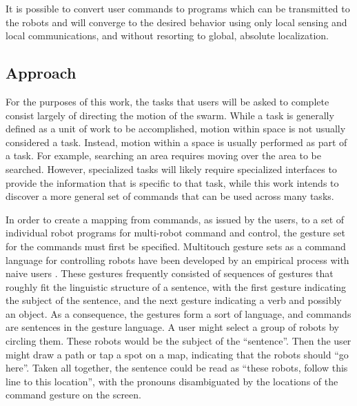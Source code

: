 \documentclass[]{article}
\begin{document}
It is possible to convert user commands to programs which can be transmitted to the robots and will converge to the desired behavior using only local sensing and local communications, and without resorting to global, absolute localization. %


\subsection{Approach}

For the purposes of this work, the tasks that users will be asked to complete consist largely of directing the motion of the swarm. 
While a task is generally defined as a unit of work to be accomplished, motion within space is not usually considered a task. 
Instead, motion within a space is usually performed as part of a task.
For example, searching an area requires moving over the area to be searched.
However, specialized tasks will likely require specialized interfaces to provide the information that is specific to that task, while this work intends to discover a more general set of commands that can be used across many tasks. 

In order to create a mapping from commands, as issued by the users, to a set of individual robot programs for multi-robot command and control, the gesture set for the commands must first be specified. 
Multitouch gesture sets as a command language for controlling robots have been developed by an empirical process with naive users \cite{Micire:2009:ANG:1731903.1731912}. 
These gestures frequently consisted of sequences of gestures that roughly fit the linguistic structure of a sentence, with the first gesture indicating the subject of the sentence, and the next gesture indicating a verb and possibly an object. 
As a consequence, the gestures form a sort of language, and commands are sentences in the gesture language.
A user might select a group of robots by circling them. 
These robots would be the subject of the ``sentence''.
Then the user might draw a path or tap a spot on a map, indicating that the robots should ``go here''. 
Taken all together, the sentence could be read as ``these robots, follow this line to this location'', with the pronouns disambiguated by the locations of the command gesture on the screen.
\end{document}
